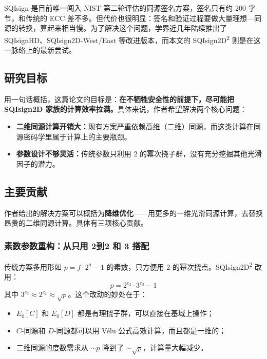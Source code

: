 \documentclass[12pt,a4paper]{ctexart}
\begin{document}
SQIsign 是目前唯一闯入 NIST 第二轮评估的同源签名方案，签名只有约 200 字节，和传统的 ECC 差不多。但代价也很明显：签名和验证过程要做大量理想—同源的转换，算起来相当慢。为了解决这个问题，学界近几年陆续推出了 SQIsignHD、SQIsign2D-West/East 等改进版本，而本文的 SQIsign2D\textsuperscript{2} 则是在这一脉络上的最新尝试。

\subsection{研究目标}

用一句话概括，这篇论文的目标是：\textbf{在不牺牲安全性的前提下，尽可能把 SQIsign2D 家族的计算效率拉满。}具体来说，作者希望解决两个核心问题：
\begin{itemize}
    \item \textbf{二维同源计算开销大：}现有方案严重依赖高维（二维）同源，而这类计算在同源密码学里属于计算上的主要瓶颈。
    \item \textbf{参数设计不够灵活：}传统参数只利用 2 的幂次挠子群，没有充分挖掘其他光滑因子的潜力。
\end{itemize}

\subsection{主要贡献}

作者给出的解决方案可以概括为\textbf{降维优化}——用更多的一维光滑同源计算，去替换昂贵的二维同源计算。具体有三项核心贡献。

\subsubsection{素数参数重构：从\textbf{只用 2}到\textbf{2 和 3 搭配}}

传统方案多用形如 $p = f \cdot 2^a - 1$ 的素数，只方便用 2 的幂次挠点。SQIsign2D\textsuperscript{2} 改用：
\begin{equation}
p = 2^{e_2} \cdot 3^{e_3} - 1
\end{equation}
其中 $3^{e_3} \approx 2^{e_2} \approx \sqrt{p}$。这个改动的妙处在于：
\begin{itemize}
    \item $E_0[C]$ 和 $E_0[D]$ 都是有理挠子群，可以直接在基域上操作；
    \item $C$-同源和 $D$-同源都可以用 V\'{e}lu 公式高效计算，而且都是一维的；
    \item 二维同源的度数需求从 $\sim p$ 降到了 $\sim \sqrt{p}$，计算量大幅减少。
\end{itemize}
\end{document}
